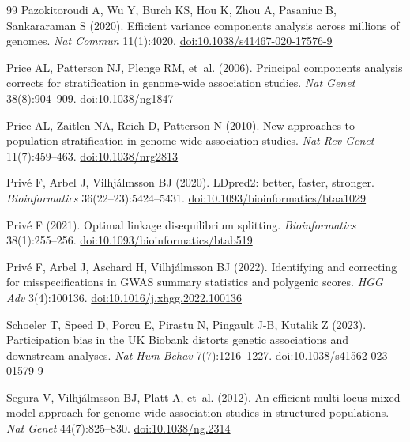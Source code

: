 \documentclass[11pt]{article}
\begin{document}
\begin{thebibliography}{99}
Pazokitoroudi A, Wu Y, Burch KS, Hou K, Zhou A, Pasaniuc B, Sankararaman S
(2020). Efficient variance components analysis across millions of genomes.
\emph{Nat Commun} 11(1):4020.
\href{https://doi.org/10.1038/s41467-020-17576-9}{doi:10.1038/s41467-020-17576-9}

Price AL, Patterson NJ, Plenge RM, et~al. (2006). Principal components
analysis corrects for stratification in genome-wide association
studies. \emph{Nat Genet} 38(8):904--909.
\href{https://doi.org/10.1038/ng1847}{doi:10.1038/ng1847}

Price AL, Zaitlen NA, Reich D, Patterson N (2010). New approaches to
population stratification in genome-wide association studies.
\emph{Nat Rev Genet} 11(7):459--463.
\href{https://doi.org/10.1038/nrg2813}{doi:10.1038/nrg2813}

Priv\'e F, Arbel J, Vilhj\'almsson BJ (2020). LDpred2: better, faster,
stronger. \emph{Bioinformatics} 36(22--23):5424--5431.
\href{https://doi.org/10.1093/bioinformatics/btaa1029}{doi:10.1093/bioinformatics/btaa1029}

Priv\'e F (2021). Optimal linkage disequilibrium splitting.
\emph{Bioinformatics} 38(1):255--256.
\href{https://doi.org/10.1093/bioinformatics/btab519}{doi:10.1093/bioinformatics/btab519}

Priv\'e F, Arbel J, Aschard H, Vilhj\'almsson BJ (2022). Identifying and
correcting for misspecifications in GWAS summary statistics and polygenic
scores. \emph{HGG Adv} 3(4):100136.
\href{https://doi.org/10.1016/j.xhgg.2022.100136}{doi:10.1016/j.xhgg.2022.100136}

Schoeler T, Speed D, Porcu E, Pirastu N, Pingault J-B, Kutalik Z (2023).
Participation bias in the UK Biobank distorts genetic associations and
downstream analyses. \emph{Nat Hum Behav} 7(7):1216--1227.
\href{https://doi.org/10.1038/s41562-023-01579-9}{doi:10.1038/s41562-023-01579-9}

Segura V, Vilhj\'almsson BJ, Platt A, et~al. (2012). An efficient
multi-locus mixed-model approach for genome-wide association studies in
structured populations. \emph{Nat Genet} 44(7):825--830.
\href{https://doi.org/10.1038/ng.2314}{doi:10.1038/ng.2314}


\end{thebibliography}
\end{document}
